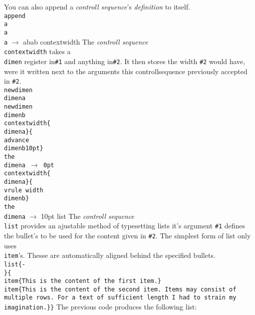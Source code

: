 You can also append a {\it controll sequence}'s {\it definition} to itself.\hfil\break
{\tt\\append\\a\\a\hfil\break
\\a} $\rightarrow$ abab
\medskip
\noindent contextwidth
\smallskip
The {\it controll sequence} {\tt\\contextwidth} takes a {\tt\\dimen} register in{\tt\#1} and anything in{\tt\#2}. It then stores the width {\tt\#2} would have, were it written next to the arguments this controllsequence previously accepted in {\tt\#2}.\hfil\break
{\tt\\newdimen\\dimena\hfil\break
\\newdimen\\dimenb\hfil\break
\\contextwidth\{\\dimena\}\{\\advance\\dimenb10pt\}\hfil\break
\\the\\dimena\hbox{ $\rightarrow$ 0pt}\hfil\break
\\contextwidth\{\\dimena\}\{\\vrule width\\dimenb\}\hfil\break
\\the\\dimena} $\rightarrow$ 10pt
\bigskip
\noindent list
\smallskip
The {\it controll sequence} {\tt\\list} provides an ajustable method of typesetting lists it's argument {\tt\#1} defines the bullet's to be used for the content given in {\tt\#2}. The simplest form of list only uses {\tt\\item}'s. Thesse are automatically aligned behind the specified bullets.
{\tt\\list\{-\\ \}\{\hfil\break
\\item\{This is the content of the first item.\}\hfil\break
\\item\{This is the content of the second item.\hfil\break
Items may consist of multiple rows.\hfil\break
For a text of sufficient length I had to strain my imagination.\}\}\hfil\break}
The previous code produces the following list:\hfil\break
{}
